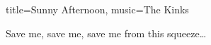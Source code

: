 \begin{song}{title={Sunny Afternoon}, music={The Kinks}}
\begin{chorus}
        Save me, save me, save me from this squeeze\ldots
    \end{chorus}
\end{song}

